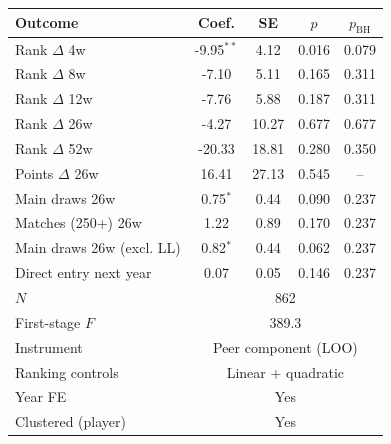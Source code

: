 \begin{tabular}{l cccc}
\toprule
Outcome & Coef. & SE & $p$ & $p_{\text{BH}}$ \\
\midrule
Rank $\Delta$ 4w & -9.95$^{**}$ & 4.12 & 0.016 & 0.079 \\
Rank $\Delta$ 8w & -7.10 & 5.11 & 0.165 & 0.311 \\
Rank $\Delta$ 12w & -7.76 & 5.88 & 0.187 & 0.311 \\
Rank $\Delta$ 26w & -4.27 & 10.27 & 0.677 & 0.677 \\
Rank $\Delta$ 52w & -20.33 & 18.81 & 0.280 & 0.350 \\
Points $\Delta$ 26w & 16.41 & 27.13 & 0.545 & -- \\
Main draws 26w & 0.75$^{*}$ & 0.44 & 0.090 & 0.237 \\
Matches (250+) 26w & 1.22 & 0.89 & 0.170 & 0.237 \\
Main draws 26w (excl. LL) & 0.82$^{*}$ & 0.44 & 0.062 & 0.237 \\
Direct entry next year & 0.07 & 0.05 & 0.146 & 0.237 \\
\midrule
$N$ & \multicolumn{4}{c}{862} \\
First-stage $F$ & \multicolumn{4}{c}{389.3} \\
Instrument & \multicolumn{4}{c}{Peer component (LOO)} \\
Ranking controls & \multicolumn{4}{c}{Linear + quadratic} \\
Year FE & \multicolumn{4}{c}{Yes} \\
Clustered (player) & \multicolumn{4}{c}{Yes} \\
\bottomrule
\end{tabular}
